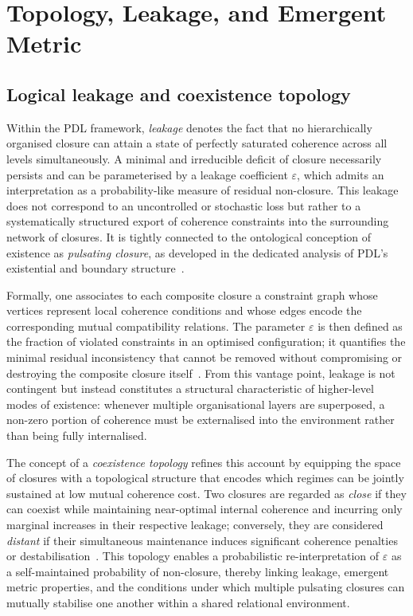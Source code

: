 \documentclass{article}
\begin{document}
\section{Topology, Leakage, and Emergent Metric}
\label{sec:topology_metric}

\subsection{Logical leakage and coexistence topology}
\label{subsec:leakage_coexistence}

Within the PDL framework, \emph{leakage} denotes the fact that no hierarchically organised closure can attain a state of perfectly saturated coherence across all levels simultaneously. A minimal and irreducible deficit of closure necessarily persists and can be parameterised by a leakage coefficient $\varepsilon$, which admits an interpretation as a probability-like measure of residual non-closure. This leakage does not correspond to an uncontrolled or stochastic loss but rather to a systematically structured export of coherence constraints into the surrounding network of closures. It is tightly connected to the ontological conception of existence as \emph{pulsating closure}, as developed in the dedicated analysis of PDL’s existential and boundary structure~\citep{Coherence_Leakage_18_2026,PDL_Main_2026,ExistencePulsatingClosure2026}.

Formally, one associates to each composite closure a constraint graph whose vertices represent local coherence conditions and whose edges encode the corresponding mutual compatibility relations. The parameter $\varepsilon$ is then defined as the fraction of violated constraints in an optimised configuration; it quantifies the minimal residual inconsistency that cannot be removed without compromising or destroying the composite closure itself~\citep{Coherence_Leakage_18_2026}. From this vantage point, leakage is not contingent but instead constitutes a structural characteristic of higher-level modes of existence: whenever multiple organisational layers are superposed, a non-zero portion of coherence must be externalised into the environment rather than being fully internalised.

The concept of a \emph{coexistence topology} refines this account by equipping the space of closures with a topological structure that encodes which regimes can be jointly sustained at low mutual coherence cost. Two closures are regarded as \emph{close} if they can coexist while maintaining near-optimal internal coherence and incurring only marginal increases in their respective leakage; conversely, they are considered \emph{distant} if their simultaneous maintenance induces significant coherence penalties or destabilisation~\citep{Topological_Reformulation_PDL_2026}. This topology enables a probabilistic re-interpretation of $\varepsilon$ as a self-maintained probability of non-closure, thereby linking leakage, emergent metric properties, and the conditions under which multiple pulsating closures can mutually stabilise one another within a shared relational environment.
\end{document}
